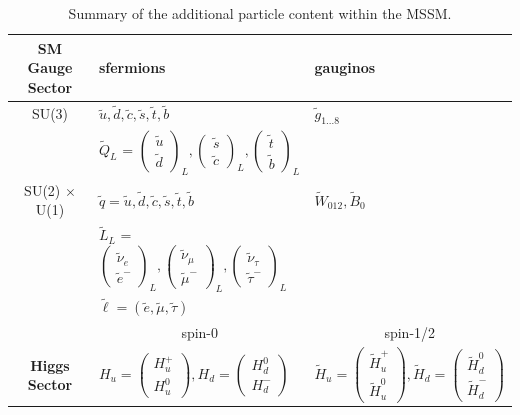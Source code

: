 \begin{table}
\caption{Summary of the additional particle content within the MSSM.}
\label{tab:mssmparticles}
\centering
\begin{tabular}{c|ll}
\hline\hline
\textbf{SM Gauge Sector} & sfermions & gauginos \\
\hline
SU(3) & $\tilde{u}, \tilde{d}, \tilde{c}, \tilde{s}, \tilde{t}, \tilde{b}$ & $\tilde{g}_{1...8}$ \\
\hline
& $\widetilde{Q}_{L}$ = $\begin{pmatrix} \tilde{u} \\ \tilde{d} \end{pmatrix}_{L}, \begin{pmatrix} \tilde{s} \\ \tilde{c} \end{pmatrix}_{L}, \begin{pmatrix} \tilde{t} \\ \tilde{b} \end{pmatrix}_{L} $ &  \\
SU(2) $\times$ U(1) & $\tilde{q} = \tilde{u}, \tilde{d}, \tilde{c}, \tilde{s}, \tilde{t}, \tilde{b}$ & $\widetilde{W}_{012}, \widetilde{B}_{0}$\\
& $\widetilde{L}_{L}$ = $\begin{pmatrix} \tilde{\nu}_{e} \\ \tilde{e}^{-} \end{pmatrix}_{L} , \begin{pmatrix} \tilde{\nu}_{\mu} \\ \tilde{\mu}^{-} \end{pmatrix}_{L} , \begin{pmatrix} \tilde{\nu}_{\tau} \\ \tilde{\tau}^{-}\end{pmatrix}_{L} $ & \\
& $\tilde{\ell} = (\tilde{e}, \tilde{\mu}, \tilde{\tau})$ & \\
\hline
& \multicolumn{1}{c}{spin-0} &  \multicolumn{1}{c}{spin-1/2} \\
\textbf{Higgs Sector} & $H_{u} = \begin{pmatrix} H_{u}^{+} \\ H_{u}^{0} \end{pmatrix},  H_{d} = \begin{pmatrix} H_{d}^{0} \\ H_{d}^{-} \end{pmatrix}$ & $\widetilde{H}_{u} = \begin{pmatrix} \widetilde{H}_{u}^{+} \\ \widetilde{H}_{u}^{0} \end{pmatrix},  \widetilde{H}_{d} = \begin{pmatrix} \widetilde{H}_{d}^{0} \\ \widetilde{H}_{d}^{-} \end{pmatrix}$\\
\hline\hline
\end{tabular}
\end{table}

